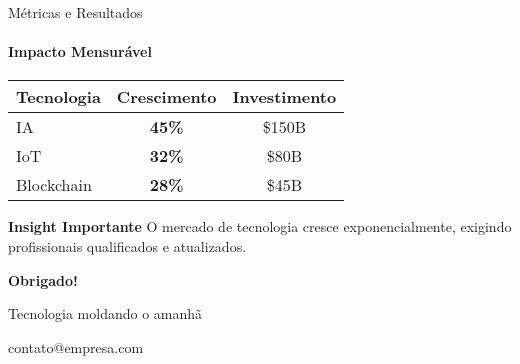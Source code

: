 \documentclass[aspectratio=169]{beamer}
\newcommand{\destaque}[1]{\textcolor{corDestaque}{\textbf{#1}}}
\begin{document}
\begin{frame}{Métricas e Resultados}
    \framesubtitle{Impacto Mensurável}
    
    \begin{table}
        \centering
        \begin{tabular}{lcc}
            \hline
            \textbf{Tecnologia} & \textbf{Crescimento} & \textbf{Investimento} \\
            \hline
            IA & \destaque{45\%} & \$150B \\
            IoT & \destaque{32\%} & \$80B \\
            Blockchain & \destaque{28\%} & \$45B \\
            \hline
        \end{tabular}
    \end{table}
    
    \vspace{0.5cm}
    
    \begin{alertblock}{\destaque{Insight Importante}}
        O mercado de tecnologia cresce exponencialmente, exigindo profissionais qualificados e atualizados.
    \end{alertblock}
\end{frame}

\begin{frame}
    \centering
    \vspace{1cm}
    
    \Huge \textcolor{corTitulo}{\textbf{Obrigado!}}
    
    \vspace{0.5cm}
    
    \Large \textcolor{corSubtitulo}{Tecnologia moldando o amanhã}
    
    \vspace{1cm}
    
    \normalsize \textcolor{corDestaque}{contato@empresa.com}
\end{frame}
\end{document}
